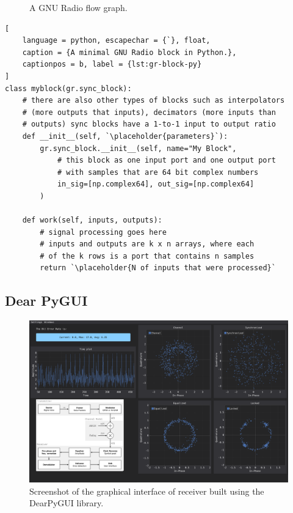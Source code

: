 \begin{figure}
	\caption{
		A GNU Radio flow graph.
		\label{fig:flowgraph}
	}
\end{figure}

{\newcommand{\placeholder}[1]{\textit{\(\langle\)\,\textrm{#1}\,\(\rangle\)}}
\begin{lstlisting}[
	language = python, escapechar = {`}, float,
	caption = {A minimal GNU Radio block in Python.},
	captionpos = b, label = {lst:gr-block-py}
]
class myblock(gr.sync_block):
	# there are also other types of blocks such as interpolators 
	# (more outputs that inputs), decimators (more inputs than 
	# outputs) sync blocks have a 1-to-1 input to output ratio
	def __init__(self, `\placeholder{parameters}`):
		gr.sync_block.__init__(self, name="My Block",
			# this block as one input port and one output port
			# with samples that are 64 bit complex numbers
			in_sig=[np.complex64], out_sig=[np.complex64]
		)

	def work(self, inputs, outputs):
		# signal processing goes here
		# inputs and outputs are k x n arrays, where each
		# of the k rows is a port that contains n samples
		return `\placeholder{N of inputs that were processed}`
\end{lstlisting}}

\subsection{Dear PyGUI}\label{sec:GUI}

\begin{figure}
	\centering
	\includegraphics[frame, width = \linewidth]{figures/screenshots/gui_screenshot}
	\caption{Screenshot of the graphical interface of receiver built using the DearPyGUI library.}
\end{figure}

